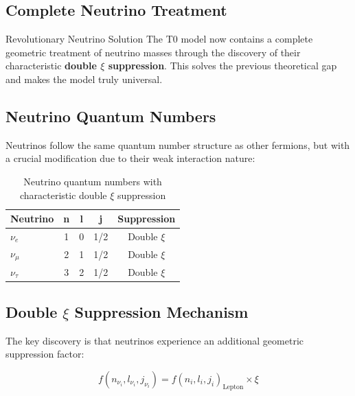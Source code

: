 	\subsection{Complete Neutrino Treatment}
	\label{sec:complete_neutrino_treatment}
	
	\begin{neutrino}{Revolutionary Neutrino Solution}{}
		The T0 model now contains a complete geometric treatment of neutrino masses through the discovery of their characteristic \textbf{double $\xi$ suppression}. This solves the previous theoretical gap and makes the model truly universal.
	\end{neutrino}
	
	\subsection{Neutrino Quantum Numbers}
	\label{subsec:neutrino_quantum_numbers}
	
	Neutrinos follow the same quantum number structure as other fermions, but with a crucial modification due to their weak interaction nature:
	
	\begin{table}[H]
		\centering

\begin{tabular}{lcccc}
			\toprule
			\textbf{Neutrino} & \textbf{n} & \textbf{l} & \textbf{j} & \textbf{Suppression} \\
			\midrule
			$\nu_e$ & 1 & 0 & 1/2 & Double $\xi$ \\
			$\nu_\mu$ & 2 & 1 & 1/2 & Double $\xi$ \\
			$\nu_\tau$ & 3 & 2 & 1/2 & Double $\xi$ \\
			\bottomrule
		\end{tabular}

		\caption{Neutrino quantum numbers with characteristic double $\xi$ suppression}
		\label{tab:neutrino_quantum_numbers}
	\end{table}
	
	\subsection{Double $\xi$ Suppression Mechanism}
	\label{subsec:double_xi_suppression}
	
	The key discovery is that neutrinos experience an additional geometric suppression factor:
	
	\begin{equation}
		f(n_{\nu_i}, l_{\nu_i}, j_{\nu_i}) = f(n_i, l_i, j_i)_{\text{Lepton}} \times \xi
		\label{eq:neutrino_suppression}
	\end{equation}
	
